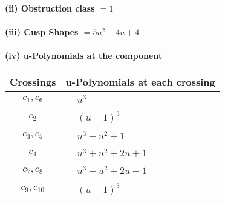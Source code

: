 \documentclass[1p]{elsarticle_modified}
\theoremstyle{definition}
\begin{document}
\flushleft \textbf{(ii) Obstruction class $= 1$}\\~\\
\flushleft \textbf{(iii) Cusp Shapes $= 5 u^2-4 u+4$}\\~\\
\newpage\renewcommand{\arraystretch}{1}
\flushleft \textbf{(iv) u-Polynomials at the component}\newline \\
\begin{tabular}{m{50pt}|m{274pt}}
Crossings & \hspace{64pt}u-Polynomials at each crossing \\
\hline $$\begin{aligned}c_{1},c_{6}\end{aligned}$$&$\begin{aligned}
&u^3
\end{aligned}$\\
\hline $$\begin{aligned}c_{2}\end{aligned}$$&$\begin{aligned}
&(u+1)^3
\end{aligned}$\\
\hline $$\begin{aligned}c_{3},c_{5}\end{aligned}$$&$\begin{aligned}
&u^3- u^2+1
\end{aligned}$\\
\hline $$\begin{aligned}c_{4}\end{aligned}$$&$\begin{aligned}
&u^3+u^2+2 u+1
\end{aligned}$\\
\hline $$\begin{aligned}c_{7},c_{8}\end{aligned}$$&$\begin{aligned}
&u^3- u^2+2 u-1
\end{aligned}$\\
\hline $$\begin{aligned}c_{9},c_{10}\end{aligned}$$&$\begin{aligned}
&(u-1)^3
\end{aligned}$\\
\hline
\end{tabular}\\~\\
\newpage\renewcommand{\arraystretch}{1}
\end{document}

